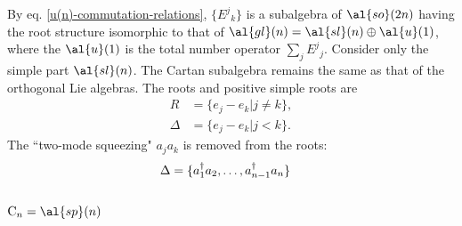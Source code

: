 By eq. \eqref{u(n)-commutation-relations}, $\{ E^j{}_k \}$ is a subalgebra of $\al{so}(2n)$ having the root structure isomorphic to that of $\al{gl}(n) = \al{sl}(n) \oplus \al{u}(1)$, where the $\al{u}(1)$ is the total number operator $\sum_j E^j{}_j$. Consider only the simple part $\al{sl}(n)$. The Cartan subalgebra remains the same as that of the orthogonal Lie algebras. The roots and positive simple roots are
\begin{align}
	R &= \{ e_j - e_k |j \neq k \}, \\
	\Delta &= \{ e_j - e_k |j < k \}.
\end{align}
The ``two-mode squeezing" $a_j a_k$ is removed from the roots:
\begin{align}
	\Delta &= \{ a_1^{\dagger} a_2, \dots, a_{n-1}^{\dagger} a_n \}
\end{align}
\begin{center}
\end{center}

\subsubsection{$\text{C}_n = \al{sp}(n)$}

